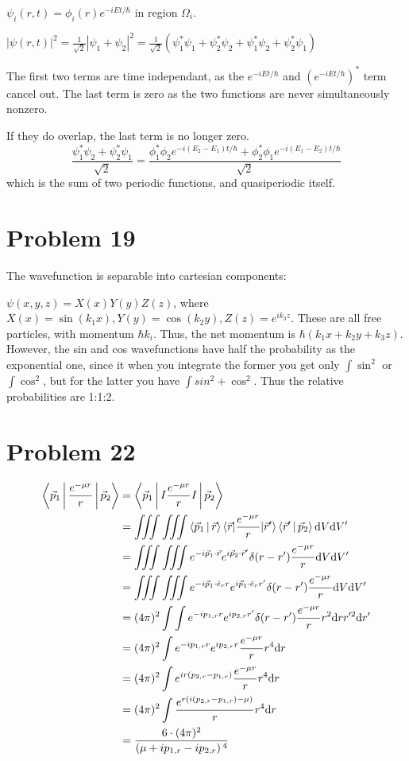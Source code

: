 \documentclass[12pt]{article}
\begin{document}
$\psi_i(r,t)=\phi_i(r)e^{-iEt/\hbar}$ in region $\Omega_i$.

$|\psi(r,t)|^2=\frac1{\sqrt{2}}|\psi_1+\psi_2|^2=\frac1{\sqrt{2}}\left(\psi_1^*\psi_1+\psi_2^*\psi_2+\psi_1^*\psi_2+\psi_2^*\psi_1\right)$

The first two terms are time independant, as the $e^{-iEt/\hbar}$ and $\left(e^{-iEt/\hbar}\right)^*$ term cancel out. The last term is zero as the two functions are never simultaneously nonzero.

If they do overlap, the last term is no longer zero. $$\frac{\psi_1^*\psi_2+\psi_2^*\psi_1}{\sqrt{2}}=\frac{\phi_1^*\phi_2 e^{-i(E_2-E_1)t/\hbar} + \phi_2^*\phi_1 e^{-i(E_1-E_2)t/\hbar}}{\sqrt{2}}$$ which is the sum of two periodic functions, and quasiperiodic itself.

\section*{Problem 19}

The wavefunction is separable into cartesian components:

$\psi(x,y,z)=X(x)Y(y)Z(z)$, where $X(x)=\sin(k_1 x), Y(y)=\cos(k_2 y), Z(z)=e^{ik_3z}$. These are all free particles, with momentum $\hbar k_i$. Thus, the net momentum is $\hbar\left(k_1x+k_2y+k_3z\right)$. However, the sin and cos wavefunctions have half the probability as the exponential one, since it when you integrate the former you get only $\int \sin^2$ or $\int \cos^2$, but for the latter you have $\int sin^2+\cos^2$. Thus the relative probabilities are 1:1:2.

\section*{Problem 22}
\begin{align*}
\Braket{\vec p_1|\frac{e^{-\mu r}}{r}|\vec p_2} &= \Braket{\vec p_1|I\frac{e^{-\mu r}}{r}I|\vec p_2}\\
&=\iiint\iiint\Braket{\vec p_1|\vec r}\braket{\vec r|\frac{e^{-\mu r}}{r}|\vec r'}\Braket{\vec r'|\vec p_2} \mathrm d V \mathrm dV'\\
&= \iiint \iiint e^{-i\vec p_1\cdot\vec r}e^{i\vec p_2\cdot\vec r'}\delta(r-r')\frac{e^{-\mu r}}{r}\mathrm dV\mathrm dV'\\
&= \iiint \iiint e^{-i\vec p_1\cdot\hat e_r r}e^{i\vec p_1\cdot\hat e_r r'}\delta(r-r')\frac{e^{-\mu r}}{r}\mathrm dV\mathrm dV'\\
&= (4\pi)^2\int\int e^{-i p_{1,r}r}e^{i p_{2,r} r'}\delta(r-r')\frac{e^{-\mu r}}{r}r^2\mathrm drr'^2\mathrm dr'\\
&=(4\pi)^2 \int e^{-i p_{1,r} r}e^{ip_{2,r} r}\frac{e^{-\mu r}}{r}r^4\mathrm dr\\
&= (4\pi)^2\int e^{ir(p_{2,r}-p_{1,r})} \frac{e^{-\mu r}}{r} r^4\mathrm dr\\
&= (4\pi)^2\int \frac{e^{r(i(p_{2,r}-p_{1,r})-\mu)}}{r}r^4\mathrm dr\\
&= \frac{6\cdot (4\pi)^2}{\left(\mu +i p_{1,r}-i p_{2,r}\right){}^4}
\end{align*}
\end{document}
